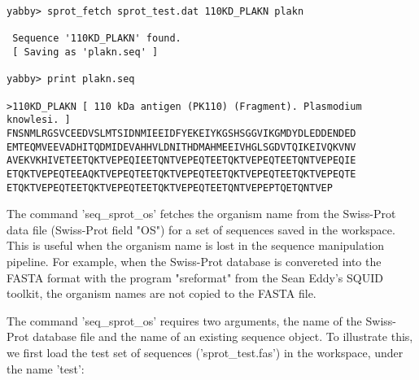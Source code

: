 \begin{verbatim}
yabby> sprot_fetch sprot_test.dat 110KD_PLAKN plakn

 Sequence '110KD_PLAKN' found.
 [ Saving as 'plakn.seq' ]

yabby> print plakn.seq

>110KD_PLAKN [ 110 kDa antigen (PK110) (Fragment). Plasmodium knowlesi. ]
FNSNMLRGSVCEEDVSLMTSIDNMIEEIDFYEKEIYKGSHSGGVIKGMDYDLEDDENDED
EMTEQMVEEVADHITQDMIDEVAHHVLDNITHDMAHMEEIVHGLSGDVTQIKEIVQKVNV
AVEKVKHIVETEETQKTVEPEQIEETQNTVEPEQTEETQKTVEPEQTEETQNTVEPEQIE
ETQKTVEPEQTEEAQKTVEPEQTEETQKTVEPEQTEETQKTVEPEQTEETQKTVEPEQTE
ETQKTVEPEQTEETQKTVEPEQTEETQKTVEPEQTEETQNTVEPEPTQETQNTVEP
\end{verbatim}


The command 'seq\_sprot\_os' fetches the organism name from the
Swiss-Prot data file (Swiss-Prot field "OS") for a set of sequences
saved in the workspace. This is useful when the organism name is
lost in the sequence manipulation pipeline. For example, when the
Swiss-Prot database is convereted into the FASTA format with the
program "sreformat" from the Sean Eddy's SQUID toolkit, the organism
names are not copied to the FASTA file.

The command 'seq\_sprot\_os' requires two arguments, the name of the
Swiss-Prot database file and the name of an existing sequence object.
To illustrate this, we first load the test set of sequences
('sprot\_test.fas') in the workspace, under the name 'test':

